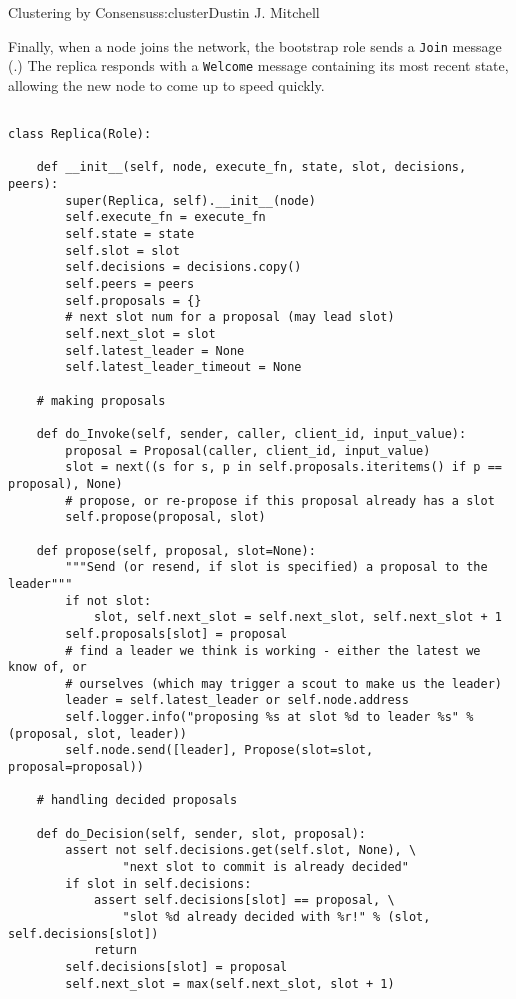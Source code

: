 \begin{aosachapter}{Clustering by Consensus}{s:cluster}{Dustin J. Mitchell}

Finally, when a node joins the network, the bootstrap role sends a
\texttt{Join} message (.) The replica
responds with a \texttt{Welcome} message containing its most recent
state, allowing the new node to come up to speed quickly.


\begin{verbatim}

class Replica(Role):

    def __init__(self, node, execute_fn, state, slot, decisions, peers):
        super(Replica, self).__init__(node)
        self.execute_fn = execute_fn
        self.state = state
        self.slot = slot
        self.decisions = decisions.copy()
        self.peers = peers
        self.proposals = {}
        # next slot num for a proposal (may lead slot)
        self.next_slot = slot
        self.latest_leader = None
        self.latest_leader_timeout = None

    # making proposals

    def do_Invoke(self, sender, caller, client_id, input_value):
        proposal = Proposal(caller, client_id, input_value)
        slot = next((s for s, p in self.proposals.iteritems() if p == proposal), None)
        # propose, or re-propose if this proposal already has a slot
        self.propose(proposal, slot)

    def propose(self, proposal, slot=None):
        """Send (or resend, if slot is specified) a proposal to the leader"""
        if not slot:
            slot, self.next_slot = self.next_slot, self.next_slot + 1
        self.proposals[slot] = proposal
        # find a leader we think is working - either the latest we know of, or
        # ourselves (which may trigger a scout to make us the leader)
        leader = self.latest_leader or self.node.address
        self.logger.info("proposing %s at slot %d to leader %s" % (proposal, slot, leader))
        self.node.send([leader], Propose(slot=slot, proposal=proposal))

    # handling decided proposals

    def do_Decision(self, sender, slot, proposal):
        assert not self.decisions.get(self.slot, None), \
                "next slot to commit is already decided"
        if slot in self.decisions:
            assert self.decisions[slot] == proposal, \
                "slot %d already decided with %r!" % (slot, self.decisions[slot])
            return
        self.decisions[slot] = proposal
        self.next_slot = max(self.next_slot, slot + 1)


\end{verbatim}
\end{aosachapter}
